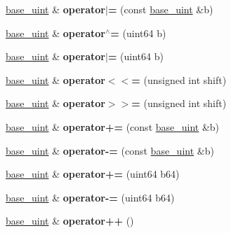 \begin{DoxyCompactItemize}
\mbox{\hyperlink{classbase__uint}{base\+\_\+uint}} \& {\bfseries operator$\vert$=} (const \mbox{\hyperlink{classbase__uint}{base\+\_\+uint}} \&b)
\item 
\mbox{\label{classbase__uint_a6fd2b386c208abda9d613b02de3732d0}} 
\mbox{\hyperlink{classbase__uint}{base\+\_\+uint}} \& {\bfseries operator$^\wedge$=} (uint64 b)
\item 
\mbox{\label{classbase__uint_aca7cb79ec0a48e1fd0560740b96e0128}} 
\mbox{\hyperlink{classbase__uint}{base\+\_\+uint}} \& {\bfseries operator$\vert$=} (uint64 b)
\item 
\mbox{\label{classbase__uint_a57a2942a101cdb2e028b3f5b7520110d}} 
\mbox{\hyperlink{classbase__uint}{base\+\_\+uint}} \& {\bfseries operator$<$$<$=} (unsigned int shift)
\item 
\mbox{\label{classbase__uint_a37ed8249249c75a860c809b9b58a478b}} 
\mbox{\hyperlink{classbase__uint}{base\+\_\+uint}} \& {\bfseries operator$>$$>$=} (unsigned int shift)
\item 
\mbox{\label{classbase__uint_a8fb3109e7c46536bb66ac41242176246}} 
\mbox{\hyperlink{classbase__uint}{base\+\_\+uint}} \& {\bfseries operator+=} (const \mbox{\hyperlink{classbase__uint}{base\+\_\+uint}} \&b)
\item 
\mbox{\label{classbase__uint_a89d8332840076ec102839b8a10dda9b4}} 
\mbox{\hyperlink{classbase__uint}{base\+\_\+uint}} \& {\bfseries operator-\/=} (const \mbox{\hyperlink{classbase__uint}{base\+\_\+uint}} \&b)
\item 
\mbox{\label{classbase__uint_aa3882cfed6f822416cec2d49e08f45df}} 
\mbox{\hyperlink{classbase__uint}{base\+\_\+uint}} \& {\bfseries operator+=} (uint64 b64)
\item 
\mbox{\label{classbase__uint_a88979c400604a84ed2413861d06d26a6}} 
\mbox{\hyperlink{classbase__uint}{base\+\_\+uint}} \& {\bfseries operator-\/=} (uint64 b64)
\item 
\mbox{\label{classbase__uint_a56b54869886808961092d3f764fadd9f}} 
\mbox{\hyperlink{classbase__uint}{base\+\_\+uint}} \& {\bfseries operator++} ()

\end{DoxyCompactItemize}
